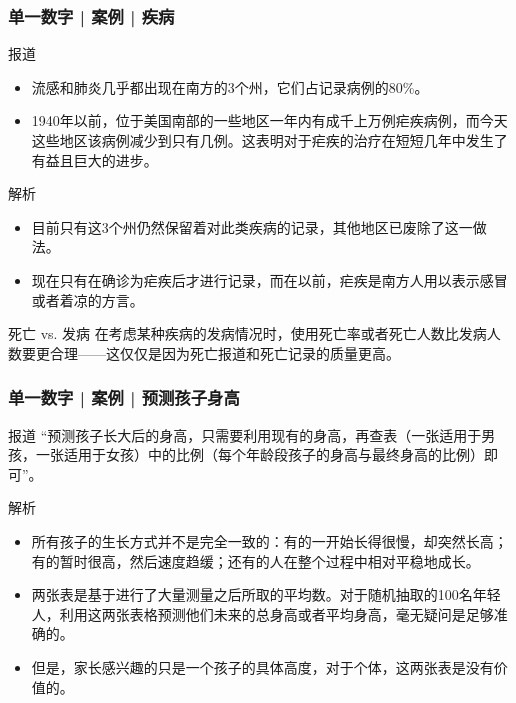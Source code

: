 \begin{frame}
  \frametitle{单一数字 | 案例 | 疾病}
  \begin{block}{报道}
    \begin{itemize}
      \item 流感和肺炎几乎都出现在南方的3个州，它们占记录病例的80\%。
      \item 1940年以前，位于美国南部的一些地区一年内有成千上万例疟疾病例，而今天这些地区该病例减少到只有几例。这表明对于疟疾的治疗在短短几年中发生了有益且巨大的进步。
    \end{itemize}
  \end{block}
  \vspace{-0.4em}
  \pause \pause \pause \pause
  \begin{block}{解析}
    \begin{itemize}
      \item 目前只有这3个州仍然保留着对此类疾病的记录，其他地区已废除了这一做法。
      \item 现在只有在确诊为疟疾后才进行记录，而在以前，疟疾是南方人用以表示感冒或者着凉的方言。
    \end{itemize}
  \end{block}
  \vspace{-0.4em}
  \pause
  \begin{block}{死亡 vs. 发病}
    在考虑某种疾病的发病情况时，使用死亡率或者死亡人数比发病人数要更合理——这仅仅是因为死亡报道和死亡记录的质量更高。
  \end{block}
\end{frame}

\begin{frame}
  \frametitle{单一数字 | 案例 | 预测孩子身高}
  \begin{block}{报道}
    “预测孩子长大后的身高，只需要利用现有的身高，再查表（一张适用于男孩，一张适用于女孩）中的比例（每个年龄段孩子的身高与最终身高的比例）即可”。
  \end{block}
  \pause \pause \pause \pause
  \begin{block}{解析}
    \begin{itemize}
      \item 所有孩子的生长方式并不是完全一致的：有的一开始长得很慢，却突然长高；有的暂时很高，然后速度趋缓；还有的人在整个过程中相对平稳地成长。
      \item 两张表是基于进行了大量测量之后所取的平均数。对于随机抽取的100名年轻人，利用这两张表格预测他们未来的总身高或者平均身高，毫无疑问是足够准确的。
      \item 但是，家长感兴趣的只是一个孩子的具体高度，对于个体，这两张表是没有价值的。
    \end{itemize}
  \end{block}
\end{frame}

